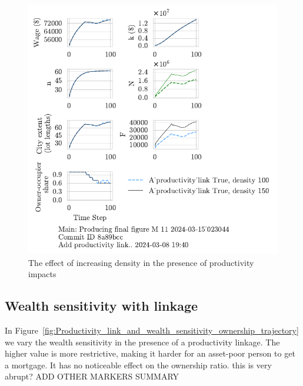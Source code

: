 {\begin{figure}[h!b]
    \centering
    \includegraphics[scale=1, trim={0 1.4cm 0 0},clip]{fig/With-productivity_link-density-023044.pdf}
    \caption{The effect of increasing density in the presence of productivity impacts}
    \label{fig:Productivity_link_and_density_ownership_trajectory}
\end{figure}




\newpage
\subsection{Wealth sensitivity with linkage}
In Figure~\ref{fig:Productivity_link_and_wealth_sensitivity_ownership_trajectory} we vary the wealth sensitivity in the presence of a productivity linkage. The higher value is more restrictive, making it harder for an asset-poor person to get a mortgage. It has no noticeable effect on the ownership ratio. {\color{red} this is very abrupt? ADD OTHER MARKERS SUMMARY}





}
